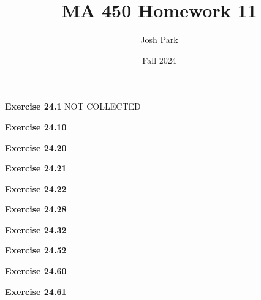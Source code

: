 \documentclass{article}
\author{Josh Park}
\date{\vspace*{-1em}Fall 2024}
\title{\vspace*{-2em}MA 450 Homework 11\vspace*{-1em}}
\begin{document}
\maketitle
\textbf{Exercise 24.1} NOT COLLECTED
\newpage

\textbf{Exercise 24.10}
\newpage

\textbf{Exercise 24.20}
\newpage

\textbf{Exercise 24.21}
\newpage

\textbf{Exercise 24.22}
\newpage

\textbf{Exercise 24.28}
\newpage

\textbf{Exercise 24.32}
\newpage

\textbf{Exercise 24.52}
\newpage

\textbf{Exercise 24.60}
\newpage

\textbf{Exercise 24.61}
\newpage
\end{document}
